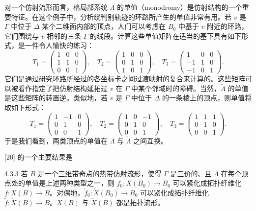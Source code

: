 对一个仿射流形而言，格局部系统 $\Lambda$ 的单值（monodromy）是仿射结构的一个重要特征。在这个例子中，分析绕判别轨迹的环路所产生的单值非常有用。若 $v$ 是 $\Gamma$ 中位于 $\Delta$ 某个二维面内部的顶点，人们可以考虑在 $B_0$ 中基于 $v$ 附近的环路，它们围绕与 $v$ 相邻的三条 $\Gamma$ 的线段。计算这些单值矩阵在适当的基下具有如下形式，是一件令人愉快的练习：
\[
T_1=\begin{pmatrix}1&0&0\\1&1&0\\0&0&1\end{pmatrix},\quad
T_2=\begin{pmatrix}1&0&0\\0&1&0\\1&0&1\end{pmatrix},\quad
T_3=\begin{pmatrix}1&0&0\\-1&1&0\\-1&0&1\end{pmatrix}.
\]
它们是通过研究环路所经过的各坐标卡之间过渡映射的复合来计算的。这些矩阵可以被看作指定了把仿射结构延拓过 $v$ 在 $\Gamma$ 中某个邻域时的障碍。当然，$\check\Lambda$ 的单值是这些矩阵的转置逆。类似地，若 $v$ 是 $\Gamma$ 中位于 $\Delta$ 的一条棱上的顶点，则单值将取如下形式：
\[
T_1=\begin{pmatrix}1&-1&0\\0&1&0\\0&0&1\end{pmatrix},\quad
T_2=\begin{pmatrix}1&0&-1\\0&1&0\\0&0&1\end{pmatrix},\quad
T_3=\begin{pmatrix}1&1&1\\0&1&0\\0&0&1\end{pmatrix}.
\]
于是我们看到，两类顶点的单值在 $\Lambda$ 与 $\check\Lambda$ 之间互换。

[20] 的一个主要结果是

\begin{theorem}{4.3.3}
若 $B$ 是一个三维带奇点的热带仿射流形，使得 $\Gamma$ 是三价的、且 $\Lambda$ 在每个顶点处的单值是上述两种类型之一，则 $f_0:X(B_0)\to B_0$ 可以紧化成拓扑纤维化 $f:X(B)\to B$。对偶地，$\check f_0:\check X(B_0)\to B_0$ 可以紧化成拓扑纤维化 $\check f:\check X(B)\to B$。$X(B)$ 与 $\check X(B)$ 都是拓扑流形。
\end{theorem}
